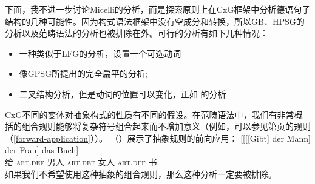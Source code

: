 下面，我不进一步讨论Micelli的分析，而是探索原则上在CxG框架中分析德语句子结构的几种可能性。因为构式语法框架中没有空成分和转换，所以GB、HPSG的分析以及范畴语法的分析也被排除在外。可行的分析有如下几种情况：
\begin{itemize}
\item 一种类似于LFG的分析，设置一个可选动词
\item 像GPSG所提出的完全扁平的分析;
\item 二叉结构分析，但是动词的位置可以变化，正如 \citet[]{Steedman2000a-u}的分析
\end{itemize}
%
CxG不同的变体对抽象构式的性质有不同的假设。在范畴语法中，我们有非常概括的组合规则能够将复杂符号组合起来而不增加意义（例如，可以参见第\pageref{forward-application}页的规则（\ref{forward-application}））。 （）展示了抽象规则的前向应用：
\ea
\gll {}[[[[Gibt] der Mann] der Frau] das Buch]\\
	 {}\spacebr{}\spacebr{}\spacebr{}\spacebr{}给 \textsc{art}.\textsc{def} 男人 \textsc{art}.\textsc{def} 女人 \textsc{art}.\textsc{def} 书\\
\z
如果我们不希望使用这种抽象的组合规则，那么这种分析一定要被排除。

